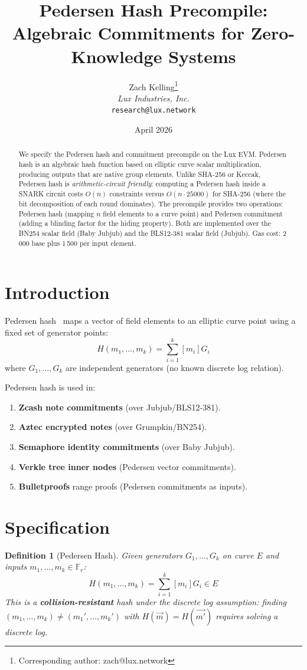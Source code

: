 \documentclass[11pt,a4paper]{article}
\title{Pedersen Hash Precompile:\\Algebraic Commitments for Zero-Knowledge Systems}
\author{
Zach Kelling\thanks{Corresponding author: zach@lux.network}\\
\textit{Lux Industries, Inc.}\\
\texttt{research@lux.network}
}
\date{April 2026}
\newtheorem{definition}{Definition}
\begin{document}
\luxcoverpage

\begin{abstract}
We specify the Pedersen hash and commitment precompile on the Lux EVM.
Pedersen hash is an algebraic hash function based on elliptic curve scalar
multiplication, producing outputs that are native group elements. Unlike
SHA-256 or Keccak, Pedersen hash is \emph{arithmetic-circuit friendly}:
computing a Pedersen hash inside a SNARK circuit costs $O(n)$ constraints
versus $O(n \cdot 25000)$ for SHA-256 (where the bit decomposition of each
round dominates). The precompile provides two operations: Pedersen hash
(mapping $n$ field elements to a curve point) and Pedersen commitment
(adding a blinding factor for the hiding property). Both are implemented
over the BN254 scalar field (Baby Jubjub) and the BLS12-381 scalar field
(Jubjub). Gas cost: 2\,000 base plus 1\,500 per input element.
\end{abstract}

\section{Introduction}

Pedersen hash~\cite{pedersen} maps a vector of field elements to an elliptic
curve point using a fixed set of generator points:
\[
  H(m_1, \ldots, m_k) = \sum_{i=1}^{k} [m_i] G_i
\]
where $G_1, \ldots, G_k$ are independent generators (no known discrete log
relation).

Pedersen hash is used in:
\begin{enumerate}[label=(\roman*)]
  \item \textbf{Zcash note commitments} (over Jubjub/BLS12-381).
  \item \textbf{Aztec encrypted notes} (over Grumpkin/BN254).
  \item \textbf{Semaphore identity commitments} (over Baby Jubjub).
  \item \textbf{Verkle tree inner nodes} (Pedersen vector commitments).
  \item \textbf{Bulletproofs} range proofs (Pedersen commitments as inputs).
\end{enumerate}

\section{Specification}

\begin{definition}[Pedersen Hash]
Given generators $G_1, \ldots, G_k$ on curve $E$ and inputs $m_1, \ldots, m_k \in \mathbb{F}_r$:
\[
  H(m_1, \ldots, m_k) = \sum_{i=1}^{k} [m_i] G_i \in E
\]
This is a \textbf{collision-resistant} hash under the discrete log assumption:
finding $(m_1, \ldots, m_k) \neq (m_1', \ldots, m_k')$ with $H(\vec{m}) = H(\vec{m'})$
requires solving a discrete log.
\end{definition}
\end{document}
